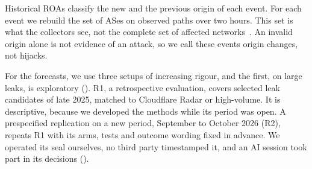 Historical ROAs classify the new and the previous origin of each event.
For each event we rebuild the set of ASes on observed paths over two hours.
This set is what the collectors see, not the complete set of affected networks~\cite{oliveira2009completeness}.
An invalid origin alone is not evidence of an attack, so we call these events origin changes, not hijacks.

For the forecasts, we use three setups of increasing rigour, and the first, on large leaks, is exploratory ().
R1, a retrospective evaluation, covers selected leak candidates of late 2025, matched to Cloudflare Radar or high-volume.
It is descriptive, because we developed the methods while its period was open.
A prespecified replication on a new period, September to October 2026 (R2), repeats R1 with its arms, tests and outcome wording fixed in advance.
We operated its seal ourselves, no third party timestamped it, and an AI session took part in its decisions ().

